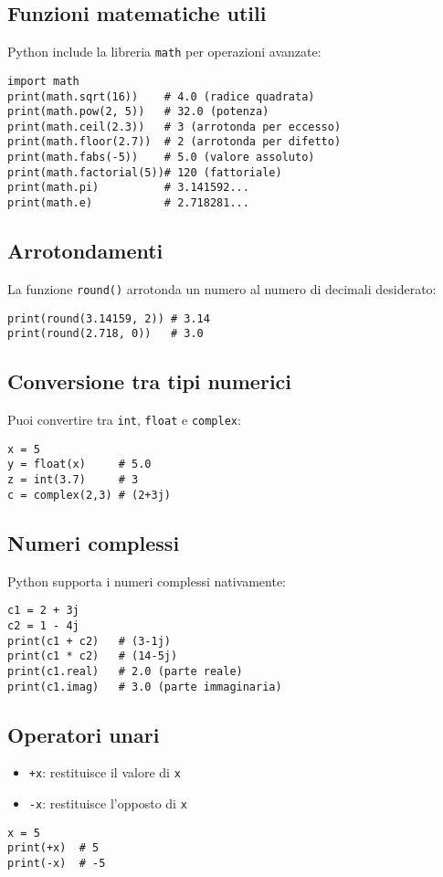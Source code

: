 \documentclass[a4paper,12pt]{article}
\begin{document}
\subsection*{Funzioni matematiche utili}
Python include la libreria \texttt{math} per operazioni avanzate:
\begin{lstlisting}
import math
print(math.sqrt(16))    # 4.0 (radice quadrata)
print(math.pow(2, 5))   # 32.0 (potenza)
print(math.ceil(2.3))   # 3 (arrotonda per eccesso)
print(math.floor(2.7))  # 2 (arrotonda per difetto)
print(math.fabs(-5))    # 5.0 (valore assoluto)
print(math.factorial(5))# 120 (fattoriale)
print(math.pi)          # 3.141592...
print(math.e)           # 2.718281...
\end{lstlisting}

\subsection*{Arrotondamenti}
La funzione \texttt{round()} arrotonda un numero al numero di decimali desiderato:
\begin{lstlisting}
print(round(3.14159, 2)) # 3.14
print(round(2.718, 0))   # 3.0
\end{lstlisting}

\subsection*{Conversione tra tipi numerici}
Puoi convertire tra \texttt{int}, \texttt{float} e \texttt{complex}:
\begin{lstlisting}
x = 5
y = float(x)     # 5.0
z = int(3.7)     # 3
c = complex(2,3) # (2+3j)
\end{lstlisting}

\subsection*{Numeri complessi}
Python supporta i numeri complessi nativamente:
\begin{lstlisting}
c1 = 2 + 3j
c2 = 1 - 4j
print(c1 + c2)   # (3-1j)
print(c1 * c2)   # (14-5j)
print(c1.real)   # 2.0 (parte reale)
print(c1.imag)   # 3.0 (parte immaginaria)
\end{lstlisting}

\subsection*{Operatori unari}
\begin{itemize}
    \item \texttt{+x}: restituisce il valore di \texttt{x}
    \item \texttt{-x}: restituisce l'opposto di \texttt{x}
\end{itemize}
\begin{lstlisting}
x = 5
print(+x)  # 5
print(-x)  # -5
\end{lstlisting}
\end{document}
